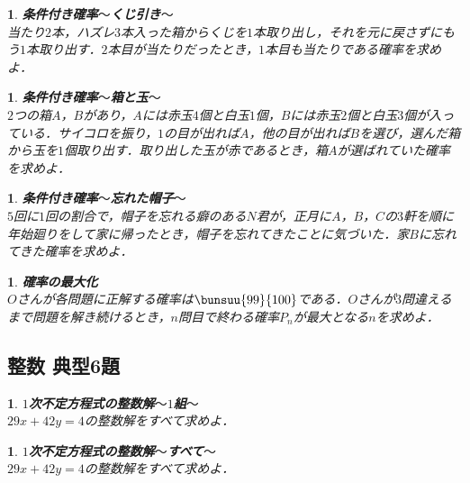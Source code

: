 \documentclass[10pt,
fleqn,
dvipdfmx,
uplatex
]{jsarticle}
\newtheorem{question}[Question]{}
\begin{document}
\begin{question}{\bf\boldmath 条件付き確率$〜$くじ引き$〜$}\\
当たり$2$本，ハズレ$3$本入った箱からくじを$1$本取り出し，それを元に戻さずにもう$1$本取り出す．$2$本目が当たりだったとき，$1$本目も当たりである確率を求めよ．
\end{question}



\begin{question}{\bf\boldmath 条件付き確率$〜$箱と玉$〜$}\\
$2$つの箱$A$，$B$があり，$A$には赤玉$4$個と白玉$1$個，$B$には赤玉$2$個と白玉$3$個が入っている．サイコロを振り，$1$の目が出れば$A$，他の目が出れば$B$を選び，選んだ箱から玉を$1$個取り出す．取り出した玉が赤であるとき，箱$A$が選ばれていた確率を求めよ．

\end{question}



\begin{question}{\bf\boldmath 条件付き確率$〜$忘れた帽子$〜$}\\
$5$回に$1$回の割合で，帽子を忘れる癖のある$N$君が，正月に$A$，$B$，$C$の$3$軒を順に年始廻りをして家に帰ったとき，帽子を忘れてきたことに気づいた．家$B$に忘れてきた確率を求めよ．
\end{question}



\begin{question}{\bf\boldmath 確率の最大化}\\
$O$さんが各問題に正解する確率は$\bunsuu{{99}}{{100}}$である．$O$さんが$3$問違えるまで問題を解き続けるとき，$n$問目で終わる確率$P_n$が最大となる$n$を求めよ．
\end{question}

\subsection{整数 典型6題}



\begin{question}{\bf\boldmath $1$次不定方程式の整数解$〜1$組$〜$}\\
${29}x+{42}y=4$の整数解をすべて求めよ．
\end{question}



\begin{question}{\bf\boldmath $1$次不定方程式の整数解$〜$すべて$〜$}\\
${29}x+{42}y=4$の整数解をすべて求めよ．
\end{question}
\end{document}
